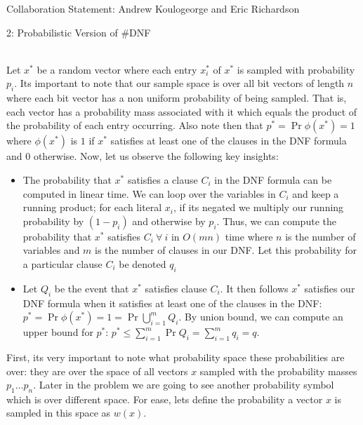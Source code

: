 \documentclass[12pt]{article}
\begin{document}

Collaboration Statement: Andrew Koulogeorge and Eric Richardson 

\begin{problem}{2: Probabilistic Version of \#DNF}
\end{problem}
\begin{solution} \ \\
Let $x^*$ be a random vector where each entry $x^*_i$ of $x^*$ is sampled with probability $p_i$. Its important to note that our sample space is over all bit vectors of length $n$ where each bit vector has a non uniform probability of being sampled. That is, each vector has a probability mass associated with it which equals the product of the probability of each entry occurring. Also note then that $p^* = \Pr{\phi(x^*)=1}$ where $\phi(x^*)$ is $1$ if $x^*$ satisfies at least one of the clauses in the DNF formula and $0$ otherwise. Now, let us observe the following key insights:
\begin{itemize}
    \item The probability that $x^*$ satisfies a clause $C_i$ in the DNF formula can be computed in linear time. We can loop over the variables in $C_i$ and keep a running product; for each literal $x_i$, if its negated we multiply our running probability by $(1-p_i)$ and otherwise by $p_i$. Thus, we can compute the probability that $x^*$ satisfies $C_i ~\forall~i$ in $O(mn)$ time where $n$ is the number of variables and $m$ is the number of clauses in our DNF. Let this probability for a particular clause $C_i$ be denoted $q_i$
    \item Let $Q_i$ be the event that $x^*$ satisfies clause $C_i$. It then follows $x^*$ satisfies our DNF formula when it satisfies at least one of the clauses in the DNF: $p^* = \Pr{\phi(x^*)=1} = \Pr{\bigcup_{i=1}^m{Q_i}}$. By union bound, we can compute an upper bound for $p^*$: $p^* \leq \sum_{i=1}^m{\Pr{Q_i}} = \sum_{i=1}^m{q_i} = q$. 
\end{itemize}
First, its very important to note what probability space these probabilities are over: they are over the space of all vectors $x$ sampled with the probability masses $p_1 \dots p_n$. Later in the problem we are going to see another probability symbol which is over different space. For ease, lets define the probability a vector $x$ is sampled in this space as $w(x)$.\\


\end{solution}
\end{document}

